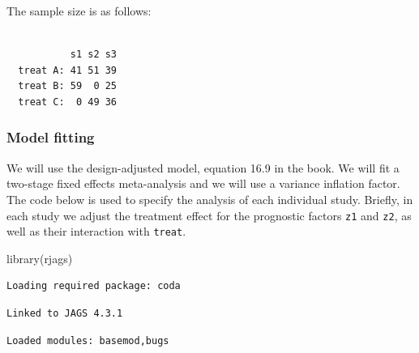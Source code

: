 \documentclass[
  letterpaper,
  DIV=11,
  numbers=noendperiod]{scrreprt}
\newenvironment{Shaded}{\begin{snugshade}}{\end{snugshade}}
\newcommand{\FunctionTok}[1]{\textcolor[rgb]{0.28,0.35,0.67}{#1}}
\newcommand{\NormalTok}[1]{\textcolor[rgb]{0.00,0.23,0.31}{#1}}
\begin{document}
The sample size is as follows:

\begin{verbatim}
          
           s1 s2 s3
  treat A: 41 51 39
  treat B: 59  0 25
  treat C:  0 49 36
\end{verbatim}

\hypertarget{model-fitting-3}{%
\subsubsection{Model fitting}\label{model-fitting-3}}

We will use the design-adjusted model, equation 16.9 in the book. We
will fit a two-stage fixed effects meta-analysis and we will use a
variance inflation factor. The code below is used to specify the
analysis of each individual study. Briefly, in each study we adjust the
treatment effect for the prognostic factors \texttt{z1} and \texttt{z2},
as well as their interaction with \texttt{treat}.

\begin{Shaded}
\begin{Highlighting}[]
\FunctionTok{library}\NormalTok{(rjags)}
\end{Highlighting}
\end{Shaded}

\begin{verbatim}
Loading required package: coda
\end{verbatim}

\begin{verbatim}
Linked to JAGS 4.3.1
\end{verbatim}

\begin{verbatim}
Loaded modules: basemod,bugs
\end{verbatim}
\end{document}

